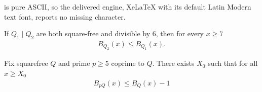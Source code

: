 \documentclass[10pt,a4paper]{amsart}
\begin{document}
is pure ASCII, so the delivered engine, XeLaTeX with its default Latin Modern text font, reports no missing character.
\begin{theorem}\label{monotonerefinement}
If $Q_1 \mid Q_2$ are both square-free and divisible by 6, then for every $x \geq 7$
\begin{align*}
B_{Q_2}(x) \leq B_{Q_1}(x).    
\end{align*}
\end{theorem}

\begin{theorem}\label{primedrop}
Fix squarefree $Q$ and prime $p \geq 5$ coprime to $Q$. There exists $X_0$ such that for all $x \geq X_0$
\begin{align*}
B_{pQ}(x)\leq B_Q(x)-1    
\end{align*}          
\end{theorem} 
\end{document}
